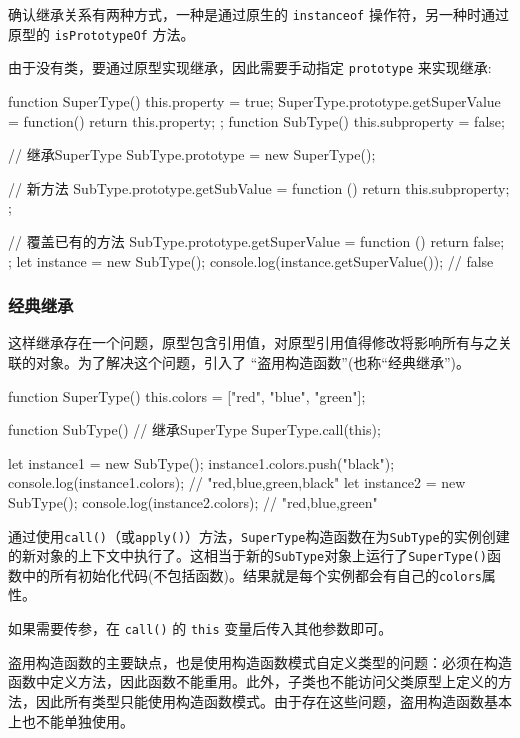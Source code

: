 确认继承关系有两种方式，一种是通过原生的 \texttt{instanceof} 操作符，另一种时通过原型的 \texttt{isPrototypeOf} 方法。

由于没有类，要通过原型实现继承，因此需要手动指定 \texttt{prototype} 来实现继承:

\begin{JavaScript}
function SuperType() {    
    this.property = true; 
} 
SuperType.prototype.getSuperValue = function() {   
    return this.property; 
}; 
function SubType() {   
    this.subproperty = false; 
} 

// 继承SuperType 
SubType.prototype = new SuperType(); 

// 新方法
SubType.prototype.getSubValue = function () { 
    return this.subproperty; 
}; 

// 覆盖已有的方法
SubType.prototype.getSuperValue = function () { 
    return false; 
}; 
let instance = new SubType(); 
console.log(instance.getSuperValue()); // false 
\end{JavaScript}

\subsubsection{经典继承}

这样继承存在一个问题，原型包含引用值，对原型引用值得修改将影响所有与之关联的对象。为了解决这个问题，引入了 ``盗用构造函数''(也称``经典继承'')。

\begin{JavaScript}
function SuperType() {    
    this.colors = ["red", "blue", "green"]; 
} 

function SubType() { 
    // 继承SuperType 
    SuperType.call(this); 
} 

let instance1 = new SubType(); 
instance1.colors.push("black"); 
console.log(instance1.colors); // "red,blue,green,black" 
let instance2 = new SubType(); 
console.log(instance2.colors); // "red,blue,green" 
\end{JavaScript}

通过使用\texttt{call()}（或\texttt{apply()}）方法，\texttt{SuperType}构造函数在为\texttt{SubType}的实例创建的新对象的上下文中执行了。这相当于新的\texttt{SubType}对象上运行了\texttt{SuperType()}函数中的所有初始化代码(不包括函数)。结果就是每个实例都会有自己的\texttt{colors}属性。

如果需要传参，在 \texttt{call()} 的 \texttt{this} 变量后传入其他参数即可。

盗用构造函数的主要缺点，也是使用构造函数模式自定义类型的问题：必须在构造函数中定义方法，因此函数不能重用。此外，子类也不能访问父类原型上定义的方法，因此所有类型只能使用构造函数模式。由于存在这些问题，盗用构造函数基本上也不能单独使用。

